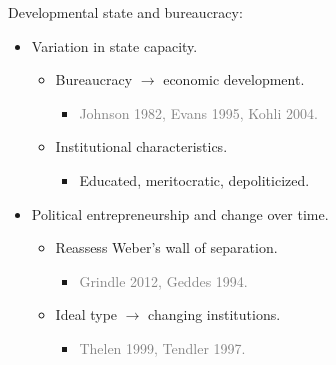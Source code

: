 \documentclass[ignorenonframetext,]{beamer}
\providecommand{\tightlist}{%
  \setlength{\itemsep}{0pt}\setlength{\parskip}{0pt}}
\begin{document}
\begin{frame}{Developmental state and bureaucracy:}

\begin{itemize}[<+->]
\tightlist
\item
  Variation in state capacity.

  \begin{itemize}[<+->]
  \tightlist
  \item
    Bureaucracy \(\rightarrow\) economic development.

    \begin{itemize}[<+->]
    \tightlist
    \item
      \textcolor{gray}{Johnson 1982, Evans 1995, Kohli 2004.}
    \end{itemize}
  \item
    Institutional characteristics.

    \begin{itemize}[<+->]
    \tightlist
    \item
      Educated, meritocratic, depoliticized.
    \end{itemize}
  \end{itemize}
\item
  Political entrepreneurship and change over time.

  \begin{itemize}[<+->]
  \tightlist
  \item
    Reassess Weber's wall of separation.

    \begin{itemize}[<+->]
    \tightlist
    \item
      \textcolor{gray}{Grindle 2012, Geddes 1994.}
    \end{itemize}
  \item
    Ideal type \(\rightarrow\) changing institutions.

    \begin{itemize}[<+->]
    \tightlist
    \item
      \textcolor{gray}{Thelen 1999, Tendler 1997.}
    \end{itemize}
  \end{itemize}
\end{itemize}

\end{frame}
\end{document}
